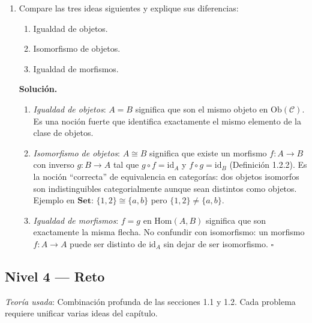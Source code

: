 \begin{enumerate}[label=\textbf{3.\arabic*.}]
\item Compare las tres ideas siguientes y explique sus diferencias:
\begin{enumerate}[label=\alph*)]
    \item Igualdad de objetos.
    \item Isomorfismo de objetos.
    \item Igualdad de morfismos.
\end{enumerate}

\textbf{Solución.}
\begin{enumerate}[label=\alph*)]
    \item \textit{Igualdad de objetos}: \(A=B\) significa que son el mismo objeto en
    \(\mathrm{Ob}(\mathcal{C})\). Es una noción fuerte que identifica exactamente el
    mismo elemento de la clase de objetos.

    \item \textit{Isomorfismo de objetos}: \(A \cong B\) significa que existe un
    morfismo \(f:A\to B\) con inverso \(g:B\to A\) tal que \(g\circ f=\mathrm{id}_A\)
    y \(f\circ g=\mathrm{id}_B\) (Definición 1.2.2). Es la noción ``correcta'' de
    equivalencia en categorías: dos objetos isomorfos son indistinguibles
    categorialmente aunque sean distintos como objetos.
    Ejemplo en \(\mathbf{Set}\): \(\{1,2\} \cong \{a,b\}\) pero \(\{1,2\}\neq\{a,b\}\).

    \item \textit{Igualdad de morfismos}: \(f=g\) en \(\mathrm{Hom}(A,B)\) significa
    que son exactamente la misma flecha. No confundir con isomorfismo: un morfismo
    \(f:A\to A\) puede ser distinto de \(\mathrm{id}_A\) sin dejar de ser isomorfismo.
    \hfill\(\square\)
\end{enumerate}

\end{enumerate}

\subsection*{Nivel 4 --- Reto}

\textit{Teoría usada}: Combinación profunda de las secciones 1.1 y 1.2.
Cada problema requiere unificar varias ideas del capítulo.

\bigskip

